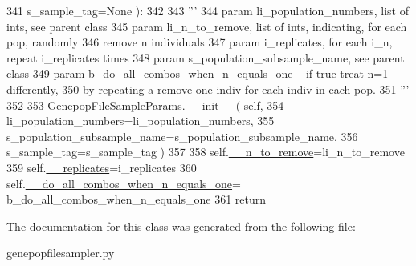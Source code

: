 \begin{DoxyCode}
341             s\_sample\_tag=\textcolor{keywordtype}{None} ):
342 
343         \textcolor{stringliteral}{'''}
344 \textcolor{stringliteral}{        param li\_population\_numbers, list of ints, see parent class}
345 \textcolor{stringliteral}{        param li\_n\_to\_remove, list of ints, indicating, for each pop, randomly }
346 \textcolor{stringliteral}{              remove n individuals}
347 \textcolor{stringliteral}{        param i\_replicates, for each i\_n, repeat i\_replicates times}
348 \textcolor{stringliteral}{        param s\_population\_subsample\_name, see parent class}
349 \textcolor{stringliteral}{        param b\_do\_all\_combos\_when\_n\_equals\_one -- if true treat n=1 differently,}
350 \textcolor{stringliteral}{              by repeating a remove-one-indiv for each indiv in each pop.}
351 \textcolor{stringliteral}{        '''}
352 
353         GenepopFileSampleParams.\_\_init\_\_( self, 
354                     li\_population\_numbers=li\_population\_numbers, 
355                     s\_population\_subsample\_name=s\_population\_subsample\_name,
356                     s\_sample\_tag=s\_sample\_tag )
357 
358         self.\hyperlink{classnegui_1_1genepopfilesampler_1_1GenepopFileSampleParamsRemoval_a23d601163d8118b7af9acf6acf78eecf}{\_\_n\_to\_remove}=li\_n\_to\_remove
359         self.\hyperlink{classnegui_1_1genepopfilesampler_1_1GenepopFileSampleParamsRemoval_ae2a4f45ac6b5377f749dc84a560dbf01}{\_\_replicates}=i\_replicates
360         self.\hyperlink{classnegui_1_1genepopfilesampler_1_1GenepopFileSampleParamsRemoval_a24a47d9cdac499238a1368dcc626e8a3}{\_\_do\_all\_combos\_when\_n\_equals\_one}=
      b\_do\_all\_combos\_when\_n\_equals\_one
361         \textcolor{keywordflow}{return}
\end{DoxyCode}


The documentation for this class was generated from the following file\+:\begin{DoxyCompactItemize}
\item 
genepopfilesampler.\+py\end{DoxyCompactItemize}
